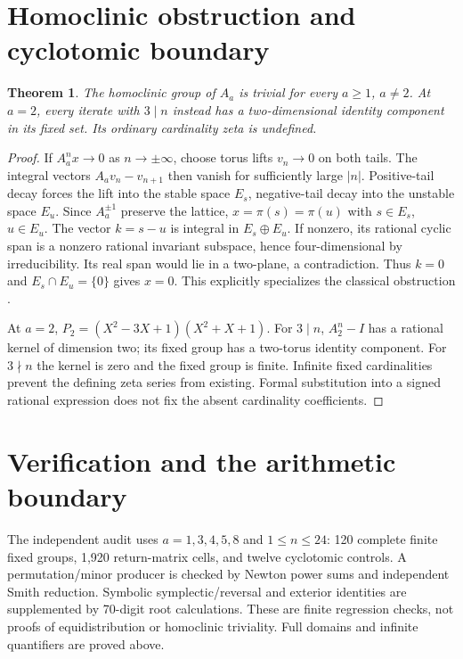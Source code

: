 \documentclass[10pt]{article}
\newtheorem{theorem}{Theorem}
\begin{document}
\section{Homoclinic obstruction and cyclotomic boundary}
\begin{theorem}
The homoclinic group of $A_a$ is trivial for every $a\ge1$, $a\ne2$.
At $a=2$, every iterate with $3\mid n$ instead has a two-dimensional
identity component in its fixed set. Its ordinary cardinality zeta is
undefined.
\end{theorem}
\begin{proof}
If $A_a^nx\to0$ as $n\to\pm\infty$, choose torus lifts $v_n\to0$
on both tails. The integral vectors $A_av_n-v_{n+1}$ then vanish for
sufficiently large $|n|$. Positive-tail decay forces the lift into the
stable space $E_s$, negative-tail decay into the unstable space $E_u$.
Since $A_a^{\pm1}$ preserve the lattice, $x=\pi(s)=\pi(u)$ with
$s\in E_s$, $u\in E_u$. The vector $k=s-u$ is integral in
$E_s\oplus E_u$. If nonzero, its rational cyclic span is a nonzero
rational invariant subspace, hence four-dimensional by irreducibility.
Its real span would lie in a two-plane, a contradiction. Thus $k=0$
and $E_s\cap E_u=\{0\}$ gives $x=0$. This explicitly specializes
the classical obstruction \cite[Theorem 4.1 and Corollary 4.2]{ls}.

At $a=2$,
$P_2=(X^2-3X+1)(X^2+X+1)$.
For $3\mid n$, $A_2^n-I$ has a rational kernel of dimension two;
its fixed group has a two-torus identity component. For $3\nmid n$
the kernel is zero and the fixed group is finite.
Infinite fixed cardinalities prevent the defining zeta series from
existing. Formal substitution into a signed rational expression does
not fix the absent cardinality coefficients.
\end{proof}
\fi

\section{Verification and the arithmetic boundary}
The independent audit uses $a=1,3,4,5,8$ and $1\le n\le24$:
120 complete finite fixed groups, 1,920 return-matrix cells, and twelve
cyclotomic controls. A permutation/minor producer is checked by Newton
power sums and independent Smith reduction. Symbolic symplectic/reversal
and exterior identities are supplemented by 70-digit root calculations.
These are finite regression checks, not proofs of equidistribution or
homoclinic triviality. Full domains and infinite quantifiers are proved above.
\end{document}
